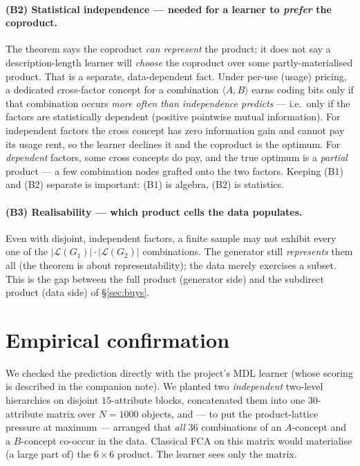 \documentclass[11pt]{article}
\theoremstyle{definition}
\theoremstyle{plain}
\theoremstyle{remark}
\newcommand{\Lgen}{\mathcal{L}}            %
\begin{document}
\paragraph{(B2) Statistical independence --- needed for a learner to \emph{prefer}
the coproduct.} The theorem says the coproduct \emph{can represent} the product;
it does not say a description-length learner will \emph{choose} the coproduct over
some partly-materialised product. That is a separate, data-dependent fact. Under
per-use (usage) pricing, a dedicated cross-factor concept for a combination
$\langle A,B\rangle$ earns coding bits only if that combination occurs
\emph{more often than independence predicts} --- i.e.\ only if the factors are
statistically dependent (positive pointwise mutual information). For independent
factors the cross concept has zero information gain and cannot pay its usage rent,
so the learner declines it and the coproduct is the optimum. For \emph{dependent}
factors, some cross concepts do pay, and the true optimum is a \emph{partial}
product --- a few combination nodes grafted onto the two factors. Keeping (B1) and
(B2) separate is important: (B1) is algebra, (B2) is statistics.

\paragraph{(B3) Realisability --- which product cells the data populates.} Even
with disjoint, independent factors, a finite sample may not exhibit every one of
the $|\Lgen(G_1)|\cdot|\Lgen(G_2)|$ combinations. The generator still
\emph{represents} them all (the theorem is about representability); the data
merely exercises a subset. This is the gap between the full product (generator
side) and the subdirect product (data side) of \S\ref{sec:buys}.

\section{Empirical confirmation}
\label{sec:experiment}

We checked the prediction directly with the project's MDL learner (whose scoring
is described in the companion note). We planted two \emph{independent} two-level
hierarchies on disjoint $15$-attribute blocks, concatenated them into one
$30$-attribute matrix over $N=1000$ objects, and --- to put the product-lattice
pressure at maximum --- arranged that \emph{all} $36$ combinations of an
$A$-concept and a $B$-concept co-occur in the data. Classical FCA on this matrix
would materialise (a large part of) the $6\times 6$ product. The learner sees only
the matrix.
\end{document}
